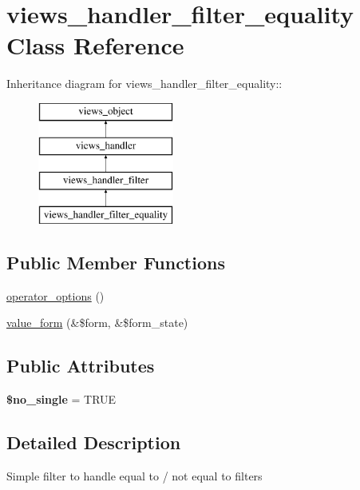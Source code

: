 \hypertarget{classviews__handler__filter__equality}{
\section{views\_\-handler\_\-filter\_\-equality Class Reference}
\label{classviews__handler__filter__equality}
}
Inheritance diagram for views\_\-handler\_\-filter\_\-equality::\begin{figure}[H]
\begin{center}
\leavevmode
\includegraphics[height=4cm]{classviews__handler__filter__equality}
\end{center}
\end{figure}
\subsection*{Public Member Functions}
\begin{CompactItemize}
\item 
\hyperlink{classviews__handler__filter__equality_65280b952e08acb863768f6316dbeb33}{operator\_\-options} ()
\item 
\hyperlink{classviews__handler__filter__equality_5ef4270bd7b8fae32e024f6ca6e7a6b8}{value\_\-form} (\&\$form, \&\$form\_\-state)
\end{CompactItemize}
\subsection*{Public Attributes}
\begin{CompactItemize}
\item 
\hypertarget{classviews__handler__filter__equality_c04d4e71d50a5d320a232149f726b787}{
\textbf{\$no\_\-single} = TRUE}
\label{classviews__handler__filter__equality_c04d4e71d50a5d320a232149f726b787}

\end{CompactItemize}


\subsection{Detailed Description}
Simple filter to handle equal to / not equal to filters 

